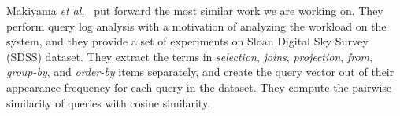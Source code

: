



Makiyama \textit{et al.}~\cite{makiyama2015text} put forward the most similar work we are working on. They perform query log analysis with a motivation of analyzing the workload on the system, and they provide a set of experiments on Sloan Digital Sky Survey (SDSS) dataset. They extract the terms in \textit{selection}, \textit{joins}, \textit{projection}, \textit{from}, \textit{group-by}, and \textit{order-by} items separately, and create the query vector out of their appearance frequency for each query in the dataset. They compute the pairwise similarity of queries with cosine similarity.



